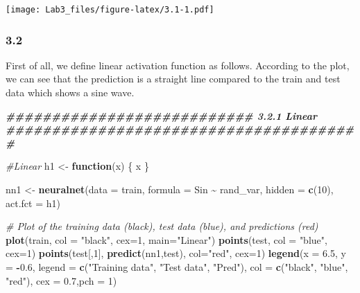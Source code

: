 \documentclass[
]{article}
\newenvironment{Shaded}{\begin{snugshade}}{\end{snugshade}}
\newcommand{\AttributeTok}[1]{\textcolor[rgb]{0.13,0.29,0.53}{#1}}
\newcommand{\CommentTok}[1]{\textcolor[rgb]{0.56,0.35,0.01}{\textit{#1}}}
\newcommand{\ControlFlowTok}[1]{\textcolor[rgb]{0.13,0.29,0.53}{\textbf{#1}}}
\newcommand{\DecValTok}[1]{\textcolor[rgb]{0.00,0.00,0.81}{#1}}
\newcommand{\DocumentationTok}[1]{\textcolor[rgb]{0.56,0.35,0.01}{\textbf{\textit{#1}}}}
\newcommand{\FloatTok}[1]{\textcolor[rgb]{0.00,0.00,0.81}{#1}}
\newcommand{\FunctionTok}[1]{\textcolor[rgb]{0.13,0.29,0.53}{\textbf{#1}}}
\newcommand{\NormalTok}[1]{#1}
\newcommand{\OtherTok}[1]{\textcolor[rgb]{0.56,0.35,0.01}{#1}}
\newcommand{\SpecialCharTok}[1]{\textcolor[rgb]{0.81,0.36,0.00}{\textbf{#1}}}
\newcommand{\StringTok}[1]{\textcolor[rgb]{0.31,0.60,0.02}{#1}}
\begin{document}
\texttt{[image: Lab3\_files/figure-latex/3.1-1.pdf]}

\subsubsection{3.2}\label{section-1}

First of all, we define linear activation function as follows. According
to the plot, we can see that the prediction is a straight line compared
to the train and test data which shows a sine wave.

\begin{Shaded}
\begin{Highlighting}[]
\DocumentationTok{\#\#\#\#\#\#\#\#\#\#\#\#\#\#\#\#\#\#\#\#\#\#\#\#\#\#\#  3.2.1 Linear \#\#\#\#\#\#\#\#\#\#\#\#\#\#\#\#\#\#\#\#\#\#\#\#\#\#\#\#\#\#\#\#\#\#\#\#\#\#\#}

\CommentTok{\#Linear}
\NormalTok{h1 }\OtherTok{\textless{}{-}} \ControlFlowTok{function}\NormalTok{(x) \{}
\NormalTok{  x}
\NormalTok{\} }

\NormalTok{nn1 }\OtherTok{\textless{}{-}} \FunctionTok{neuralnet}\NormalTok{(}\AttributeTok{data =}\NormalTok{ train, }\AttributeTok{formula =}\NormalTok{ Sin }\SpecialCharTok{\textasciitilde{}}\NormalTok{ rand\_var, }\AttributeTok{hidden =} \FunctionTok{c}\NormalTok{(}\DecValTok{10}\NormalTok{), }\AttributeTok{act.fct =}\NormalTok{ h1)}

\CommentTok{\# Plot of the training data (black), test data (blue), and predictions (red)}
\FunctionTok{plot}\NormalTok{(train,  }\AttributeTok{col =} \StringTok{"black"}\NormalTok{, }\AttributeTok{cex=}\DecValTok{1}\NormalTok{, }\AttributeTok{main=}\StringTok{"Linear"}\NormalTok{)}
\FunctionTok{points}\NormalTok{(test, }\AttributeTok{col =} \StringTok{"blue"}\NormalTok{, }\AttributeTok{cex=}\DecValTok{1}\NormalTok{)}
\FunctionTok{points}\NormalTok{(test[,}\DecValTok{1}\NormalTok{], }\FunctionTok{predict}\NormalTok{(nn1,test), }\AttributeTok{col=}\StringTok{"red"}\NormalTok{, }\AttributeTok{cex=}\DecValTok{1}\NormalTok{)}
\FunctionTok{legend}\NormalTok{(}\AttributeTok{x =} \FloatTok{6.5}\NormalTok{, }\AttributeTok{y =} \SpecialCharTok{{-}}\FloatTok{0.6}\NormalTok{, }\AttributeTok{legend =} \FunctionTok{c}\NormalTok{(}\StringTok{"Training data"}\NormalTok{, }\StringTok{"Test data"}\NormalTok{,}
\StringTok{"Pred"}\NormalTok{), }\AttributeTok{col =} \FunctionTok{c}\NormalTok{(}\StringTok{"black"}\NormalTok{, }\StringTok{"blue"}\NormalTok{, }\StringTok{"red"}\NormalTok{), }\AttributeTok{cex =} \FloatTok{0.7}\NormalTok{,}\AttributeTok{pch =} \DecValTok{1}\NormalTok{)}
\end{Highlighting}
\end{Shaded}
\end{document}
